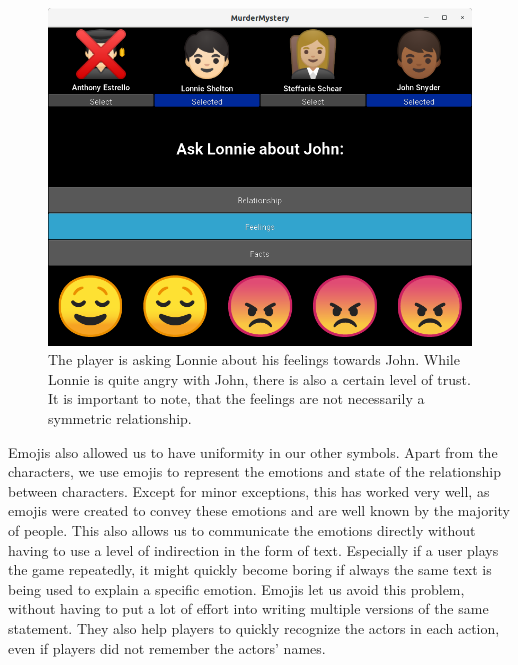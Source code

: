 \begin{figure}
  \includegraphics[width=\columnwidth]{feelings_screensot.png}
  \caption{The player is asking Lonnie about his feelings towards John. While Lonnie is quite angry with John, there is also a certain level of trust. It is important to note, that the feelings are not necessarily a symmetric relationship.}
  \label{fig:feelings}
\end{figure}

Emojis also allowed us to have uniformity in our other symbols.
Apart from the characters, we use emojis to represent the emotions and state of the relationship between characters.
Except for minor exceptions, this has worked very well, as emojis were created to convey these emotions and are well known by the majority of people.
This also allows us to communicate the emotions directly without having to use a level of indirection in the form of text.
Especially if a user plays the game repeatedly, it might quickly become boring if always the same text is being used to explain a specific emotion.
Emojis let us avoid this problem, without having to put a lot of effort into writing multiple versions of the same statement.
They also help players to quickly recognize the actors in each action, even if players did not remember the actors' names.

